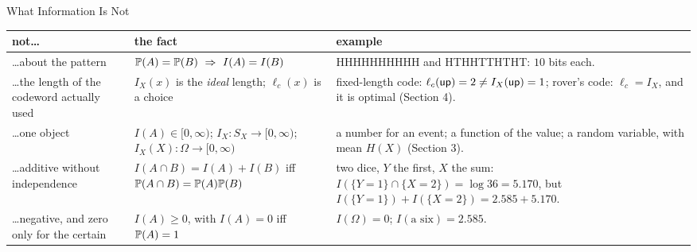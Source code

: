 \begin{frame}{What Information Is Not}
  \small
  \renewcommand{\arraystretch}{1.2}
  \begin{tabular}{@{}>{\raggedright\arraybackslash}p{3.3cm}>{\raggedright\arraybackslash}p{4.6cm}>{\raggedright\arraybackslash}p{5.2cm}@{}}
    \toprule
    not\dots & the fact & example \\
    \midrule
    \dots about the pattern &
      $\Prob(A)=\Prob(B)\ \Rightarrow\ I(A)=I(B)$ &
      HHHHHHHHHH and HTHHTTHTHT: $10$ bits each. \\
    \dots the length of the codeword actually used &
      $I_X(x)$ is the \emph{ideal} length; $\ell_c(x)$ is a choice &
      fixed-length code: $\ell_c(\textsf{up})=2\ne I_X(\textsf{up})=1$; rover's code: $\ell_c=I_X$, and it is optimal (Section 4). \\
    \dots one object &
      $I(A)\in[0,\infty)$; $I_X\colon S_X\to[0,\infty)$; $I_X(X)\colon\Omega\to[0,\infty)$ &
      a number for an event; a function of the value; a random variable, with mean $H(X)$ (Section 3). \\
    \dots additive without independence &
      $I(A\cap B)=I(A)+I(B)$ iff $\mathbb{P}(A\cap B)=\mathbb{P}(A)\mathbb{P}(B)$ &
      two dice, $Y$ the first, $X$ the sum: $I(\{Y=1\}\cap\{X=2\})=\log36=5.170$, but $I(\{Y=1\})+I(\{X=2\})=2.585+5.170$. \\
    \dots negative, and zero only for the certain &
      $I(A)\ge0$, with $I(A)=0$ iff $\mathbb{P}(A)=1$ &
      $I(\Omega)=0$; $I(\text{a six})=2.585$. \\
    \bottomrule
  \end{tabular}
\end{frame}

